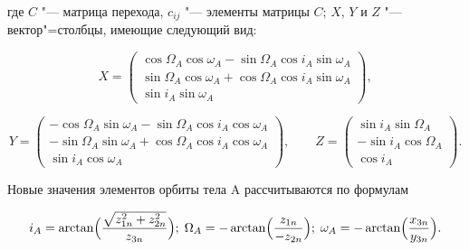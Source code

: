 где $C$ "--- матрица перехода, $c_{ij}$ "--- элементы матрицы $C$; $X$, $Y$ и $Z$ "--- вектор"=столбцы, имеющие следующий вид:

\begin{equation*}

X = \begin{pmatrix} 

		\cos\Omega_A \cos\omega_A - \sin\Omega_A \cos i_A \sin \omega_A  \\

		\sin\Omega_A \cos\omega_A + \cos\Omega_A \cos i_A \sin \omega_A  \\  

		\sin i_A \sin\omega_A 

    \end{pmatrix},

\end{equation*}



\begin{equation*}

Y = \begin{pmatrix} 

		-\cos\Omega_A \sin\omega_A - \sin\Omega_A \cos i_A \cos \omega_A  \\

		-\sin\Omega_A \sin\omega_A + \cos\Omega_A \cos i_A \cos \omega_A  \\  

		\sin i_A \cos\omega_A 

	\end{pmatrix},

\qquad 

Z = \begin{pmatrix} 

		\sin i_A \sin\Omega_A \\

		-\sin i_A \cos\Omega_A \\  

		\cos i_A 

	\end{pmatrix}.

\end{equation*}



Новые значения элементов орбиты тела A рассчитываются по формулам

\begin{equation*}

	i_A = \arctan\Bigl(\frac{\sqrt{z^2_{1n} + z^2_{2n}}}{z_{3n}}\Bigr); \; %

	\Omega_A = -\arctan\Bigl(\frac{z_{1n}}{-z_{2n}}\Bigr); \; %

	\omega_A = -\arctan\Bigl(\frac{x_{3n}}{y_{3n}}\Bigr).

\end{equation*}



